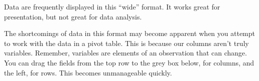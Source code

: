 \documentclass[]{book}
\newenvironment{Shaded}{\begin{snugshade}}{\end{snugshade}}
\newcommand{\CommentTok}[1]{\textcolor[rgb]{0.56,0.35,0.01}{\textit{#1}}}
\newcommand{\DataTypeTok}[1]{\textcolor[rgb]{0.13,0.29,0.53}{#1}}
\newcommand{\DecValTok}[1]{\textcolor[rgb]{0.00,0.00,0.81}{#1}}
\newcommand{\KeywordTok}[1]{\textcolor[rgb]{0.13,0.29,0.53}{\textbf{#1}}}
\newcommand{\NormalTok}[1]{#1}
\newcommand{\OperatorTok}[1]{\textcolor[rgb]{0.81,0.36,0.00}{\textbf{#1}}}
\newcommand{\OtherTok}[1]{\textcolor[rgb]{0.56,0.35,0.01}{#1}}
\newcommand{\StringTok}[1]{\textcolor[rgb]{0.31,0.60,0.02}{#1}}
\begin{document}
\begin{Shaded}
\end{Shaded}

\hypertarget{htmlwidget-8129f9376aeeec82bc6d}{}

Data are frequently displayed in this ``wide'' format. It works great for presentation, but not great for data analysis.

The shortcomings of data in this format may become apparent when you attempt to work with the data in a pivot table. This is because our columns aren't truly variables. Remember, variables are elements of an observation that can change. You can drag the fields from the top row to the grey box below, for columns, and the left, for rows. This becomes unmanageable quickly.

\begin{Shaded}
\end{Shaded}
\end{document}
